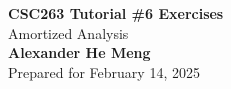 \begin{titlepage}
    \null %
    \vfill
    \begin{center}
        {\fontsize{35}{48}\selectfont \bfseries CSC263 Tutorial \#6 Exercises}
        \vspace{20pt} \\
        {\LARGE Amortized Analysis} \\
        \vspace{20pt}
        \textbf{Alexander He Meng}
        \vspace{8pt}
        \\ Prepared for February 14, 2025
    \end{center}
    \vfill
\end{titlepage}
